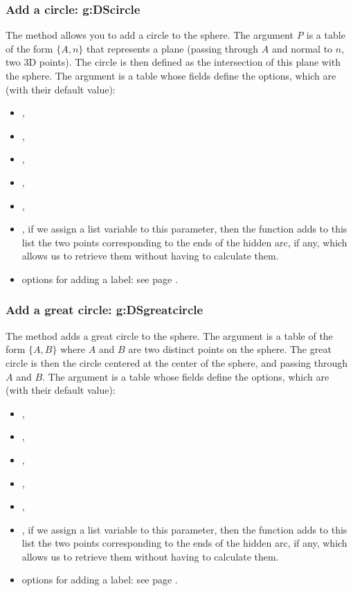 \subsubsection{Add a circle: g:DScircle}
\def\writeoptions{The \argu{options} argument is a table whose fields define the options, which are (with their default value)}%

The  method allows you to add a circle to the sphere. The argument \emph{P} is a table of the form $\{A,n\}$ that represents a plane (passing through $A$ and normal to $n$, two 3D points). The circle is then defined as the intersection of this plane with the sphere. \writeoptions:
\begin{itemize}
    \item {},
    \item {},
    \item {},
    \item {},
    \item {},
    \item {}, if we assign a list variable to this  parameter, then the function adds to this list the two points corresponding to the ends of the hidden arc, if any, which allows us to retrieve them without having to calculate them.
    \item options for adding a label: see page \pageref{addlabel}.
\end{itemize}

\subsubsection{Add a great circle: g:DSgreatcircle}

The method  adds a great circle to the sphere. The argument  is a table of the form $\{A,B\}$ where $A$ and $B$ are two distinct points on the sphere. The great circle is then the circle centered at the center of the sphere, and passing through $A$ and $B$. \writeoptions:
\begin{itemize}
    \item {},
    \item {},
    \item {},
    \item {},
    \item {},
    \item {}, if we assign a list variable to this  parameter, then the function adds to this list the two points corresponding to the ends of the hidden arc, if any, which allows us to retrieve them without having to calculate them.
    \item options for adding a label: see page \pageref{addlabel}.
\end{itemize}

